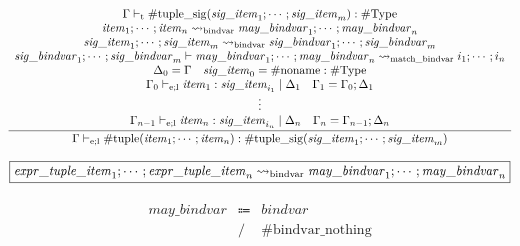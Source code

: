 \begin{gather*}
    \infer{\Gamma \vdash_{\mathrm{e}; \mathrm{l}} \mathrm{\#tuple}(\mathit{item}_1; \cdots; \mathit{item}_n): \mathrm{\#tuple\_sig}(\mathit{sig\_item}_1; \cdots; \mathit{sig\_item}_m)}{
        \begin{array}{c}
            \Gamma \vdash_\mathrm{t} \mathrm{\#tuple\_sig}(\mathit{sig\_item}_1; \cdots; \mathit{sig\_item}_m): \mathrm{\#Type}
            \\
            \mathit{item}_1; \cdots; \mathit{item}_n \rightsquigarrow_\mathrm{bindvar} \mathit{may\_bindvar}_1; \cdots; \mathit{may\_bindvar}_n
            \\
            \mathit{sig\_item}_1; \cdots; \mathit{sig\_item}_m \rightsquigarrow_\mathrm{bindvar} \mathit{sig\_bindvar}_1; \cdots; \mathit{sig\_bindvar}_m
            \\
            \mathit{sig\_bindvar}_1; \cdots; \mathit{sig\_bindvar}_m \vdash \mathit{may\_bindvar}_1; \cdots; \mathit{may\_bindvar}_n \rightsquigarrow_\mathrm{match\_bindvar} i_1; \cdots; i_n
            \\
            \Delta_0 = \Gamma
            \hspace{1em}
            \mathit{sig\_item}_0 = \mathrm{\#noname}: \mathrm{\#Type}
            \\
            \Gamma_0 \vdash_{\mathrm{e}; \mathrm{l}} \mathit{item}_1: \mathit{sig\_item}_{i_1} \mid \Delta_1
            \hspace{1em}
            \Gamma_1 = \Gamma_0; \Delta_1
            \\
            \vdots
            \\
            \Gamma_{n - 1} \vdash_{\mathrm{e}; \mathrm{l}} \mathit{item}_n: \mathit{sig\_item}_{i_n} \mid \Delta_n
            \hspace{1em}
            \Gamma_n = \Gamma_{n - 1}; \Delta_n
        \end{array}
    }
\end{gather*}

$\fbox{$\mathit{expr\_tuple\_item}_1; \cdots; \mathit{expr\_tuple\_item}_n \rightsquigarrow_\mathrm{bindvar} \mathit{may\_bindvar}_1; \cdots; \mathit{may\_bindvar}_n$}$

\begin{align*}
    \begin{array}{rcll}
        \mathit{may\_bindvar}
        &\Coloneq &\mathit{bindvar} \\
        &\mathrel{/} &\mathrm{\#bindvar\_nothing} \\
    \end{array}
\end{align*}

